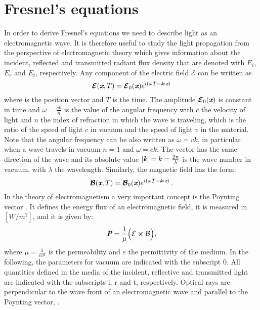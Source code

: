 \section{Fresnel's equations}
In order to derive Fresnel's equations we need to describe light as an electromagnetic wave. 
It is therefore useful to study the light propagation from the perspective of electromagnetic theory which gives information about the incident, reflected and transmitted radiant flux density that are denoted with $E_i$, $E_r$ and $E_t$, respectively.  
Any component of the electric field $\boldsymbol{\mathcal{E}}$ can be written as
\begin{equation}
\boldsymbol{\mathcal{E}}(\textit{\textbf{x}}, T) = \boldsymbol{\mathcal{E}}_0(\textit{\textbf{x}} )e^{i(\omega T - \textit{\textbf{k}}\boldsymbol{\cdot}\textit{\textbf{x}})}
\end{equation}
where  is the position vector and $T$ is the time. The amplitude $\boldsymbol{\mathcal{E}}_0(\textit{\textbf{x}})$ is constant in time and $\omega = \frac{c k}{n}$ is the value of the angular frequency with $c$ the velocity of light and $n$ the index of refraction in which the wave is traveling, which is the ratio of the speed of light $c$ in vacuum and the speed of light $v$ in the material. Note that the angular frequency can be also written as $\omega = vk$, in particular when a wave travels in vacuum $n=1$ and $\omega=ck$. The vector  has the same direction of the wave and its absolute value 
$|\textit{\textbf{k}}| = k = \frac{2\pi}{\lambda}$ is the wave number in vacuum, with $\lambda$ the wavelength. Similarly, the magnetic field has the form:
\begin{equation}
\boldsymbol{\mathcal{B}}(\textit{\textbf{x}}, T) = \boldsymbol{\mathcal{B}}_0(\textit{\textbf{x}}) e^{i(\omega T - \textit{\textbf{k}}\boldsymbol{\cdot} \textit{\textbf{x}})}\,.
\end{equation}
In the theory of electromagnetism a very important concept is the Poynting vector . 
It defines the energy flux of an electromagnetic field,  it is measured in $[W/m^2]$, and it is given by:
\begin{equation}
\textit{\textbf{P}} = \frac{1}{\mu}\Big(\mathcal{E}\boldsymbol{\times} \mathcal{B}\Big),
\end{equation}
where $\mu = \frac{1}{\varepsilon v^2}$ is the permeability and $\varepsilon$ the permittivity of the medium.
 In the following, the parameters for vacuum are indicated with the subscript $0$. All quantities defined in the media of the incident, reflective and transmitted light are indicated with the subscripts \textrm{i}, \textrm{r} and \textrm{t}, respectively. Optical rays are perpendicular to the wave front of an electromagnetic wave and parallel to the Poynting vector, \cite{jones2015optical}.

